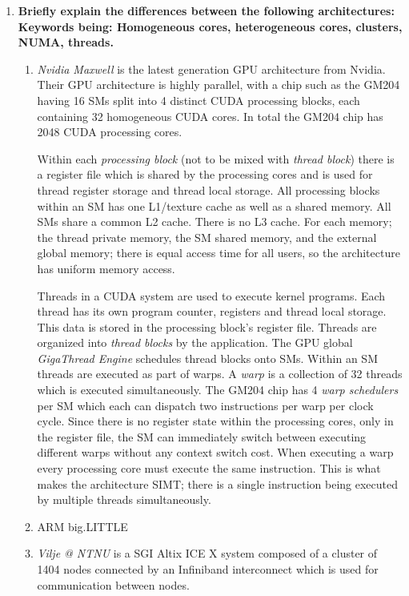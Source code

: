 \begin{enumerate}

\item \textbf{Briefly explain the differences between the following architectures:\\
Keywords being: Homogeneous cores, heterogeneous cores, clusters, NUMA, threads.}

\begin{enumerate}
\item \textit{Nvidia Maxwell} is the latest generation \ac{GPU} architecture from Nvidia. Their \ac{GPU} architecture is highly parallel, with a chip such as the GM204 having 16 \acp{SM} split into 4 distinct \ac{CUDA} processing blocks, each containing 32 homogeneous \ac{CUDA} cores. In total the GM204 chip has 2048 \ac{CUDA} processing cores.

Within each \textit{processing block} (not to be mixed with \textit{thread block}) there is a register file which is shared by the processing cores and is used for thread register storage and thread local storage. All processing blocks within an \ac{SM} has one L1/texture cache as well as a shared memory. All \acp{SM} share a common L2 cache. There is no L3 cache. For each memory; the thread private memory, the \ac{SM} shared memory, and the external global memory; there is equal access time for all users, so the architecture has uniform memory access.

Threads in a \ac{CUDA} system are used to execute kernel programs. Each thread has its own program counter, registers and thread local storage. This data is stored in the processing block's register file. Threads are organized into \textit{thread blocks} by the application. The \ac{GPU} global \textit{GigaThread Engine} schedules thread blocks onto \acp{SM}. Within an \ac{SM} threads are executed as part of warps. A \textit{warp} is a collection of 32 threads which is executed simultaneously. The GM204 chip has 4 \textit{warp schedulers} per \ac{SM} which each can dispatch two instructions per warp per clock cycle. Since there is no register state within the processing cores, only in the register file, the \ac{SM} can immediately switch between executing different warps without any context switch cost. When executing a warp every processing core must execute the same instruction. This is what makes the architecture \ac{SIMT}; there is a single instruction being executed by multiple threads simultaneously. 
\item ARM big.LITTLE

\item \textit{Vilje @ NTNU} is a \ac{SGI} Altix ICE X system composed of a cluster of 1404 nodes connected by an Infiniband interconnect which is used for communication between nodes.


\end{enumerate}
\end{enumerate}
